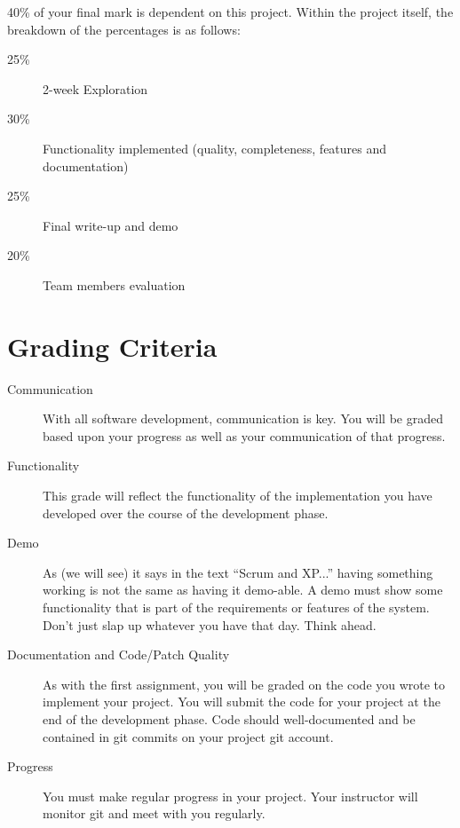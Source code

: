 \documentclass[letterpaper]{article}
\begin{document}
40\% of your final mark is dependent on this project.  Within the project
itself, the breakdown of the percentages is as follows:

\begin{description}
\item[25\%] 2-week Exploration
\item[30\%] Functionality implemented (quality, completeness, features and documentation)
\item[25\%] Final write-up and demo
\item[20\%] Team members evaluation
\end{description}

\section {Grading Criteria}
\begin{description}
\item[Communication] With all software development, communication is key.  You
will be graded based upon your progress as well as your communication of that progress.
\item[Functionality] This grade will reflect the functionality of the implementation you
have developed over the course of the development phase.
\item[Demo]
As (we will see) it says in the text ``Scrum and XP...'' having something
working is not the same as having it demo-able.  A demo must show some
functionality that is part of the requirements or features of the system.
Don't just slap up whatever you have that day.  Think ahead.
\item[Documentation and Code/Patch Quality]
As with the first assignment, you will be graded on the code you wrote to
implement your project.  You will submit the code for your project at the end
of the development phase.  Code should well-documented and be contained in
git commits on your project git account.
\item[Progress]
You must make regular progress in your project.  Your instructor will monitor
git and meet with you regularly.
\end{description}
\end{document}

